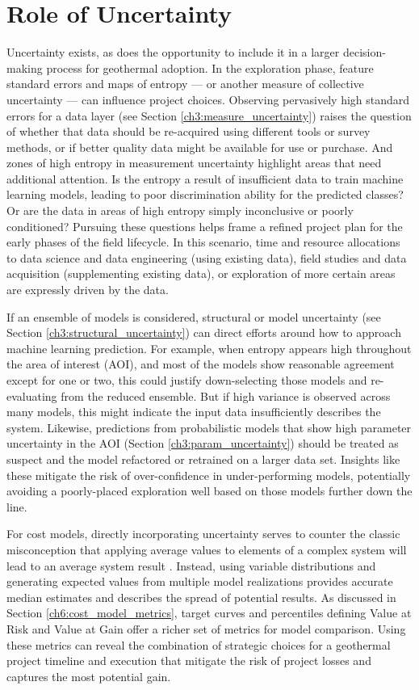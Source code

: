 \section{Role of Uncertainty}
\label{ch7:uncertainty_role}

Uncertainty exists, as does the opportunity to include it in a larger decision-making process for geothermal adoption. In the exploration phase, feature standard errors and maps of entropy --- or another measure of collective uncertainty --- can influence project choices. Observing pervasively high standard errors for a data layer (see Section \ref{ch3:measure_uncertainty}) raises the question of whether that data should be re-acquired using different tools or survey methods, or if better quality data might be available for use or purchase. And zones of high entropy in measurement uncertainty highlight areas that need additional attention. Is the entropy a result of insufficient data to train machine learning models, leading to poor discrimination ability for the predicted classes? Or are the data in areas of high entropy simply inconclusive or poorly conditioned? Pursuing these questions helps frame a refined project plan for the early phases of the field lifecycle. In this scenario, time and resource allocations to data science and data engineering (using existing data), field studies and data acquisition (supplementing existing data), or exploration of more certain areas are expressly driven by the data.

If an ensemble of models is considered, structural or model uncertainty (see Section \ref{ch3:structural_uncertainty}) can direct efforts around how to approach machine learning prediction. For example, when entropy appears high throughout the area of interest (AOI), and most of the models show reasonable agreement except for one or two, this could justify down-selecting those models and re-evaluating from the reduced ensemble. But if high variance is observed across many models, this might indicate the input data insufficiently describes the system. Likewise, predictions from probabilistic models that show high parameter uncertainty in the AOI (Section \ref{ch3:param_uncertainty}) should be treated as suspect and the model refactored or retrained on a larger data set. Insights like these mitigate the risk of over-confidence in under-performing models, potentially avoiding a poorly-placed exploration well based on those models further down the line.

For cost models, directly incorporating uncertainty serves to counter the classic misconception that applying average values to elements of a complex system will lead to an average system result \citep[Flaw of Averages,][p.\ 17-19]{de_neufville_flexibility_2011}. Instead, using variable distributions and generating expected values from multiple model realizations provides accurate median estimates and describes the spread of potential results. As discussed in Section \ref{ch6:cost_model_metrics}, target curves and percentiles defining Value at Risk and Value at Gain offer a richer set of metrics for model comparison. Using these metrics can reveal the combination of strategic choices for a geothermal project timeline and execution that mitigate the risk of project losses and captures the most potential gain.

